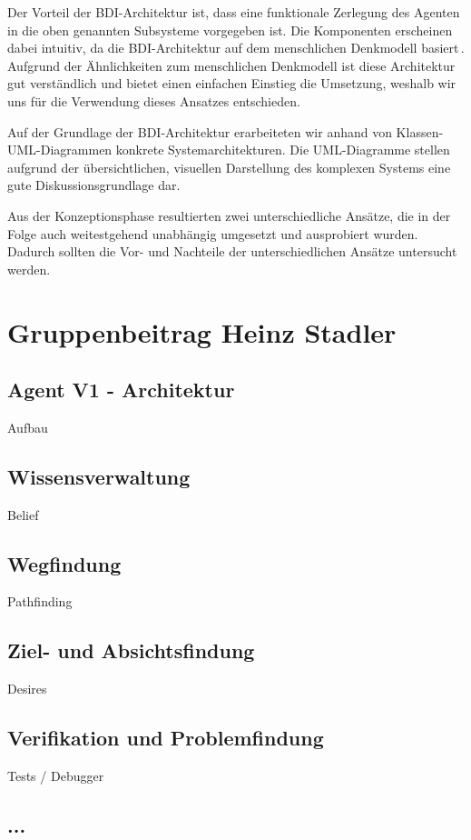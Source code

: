 \documentclass[runningheads]{llncs}
\begin{document}
Der Vorteil der BDI-Architektur ist, dass eine funktionale Zerlegung des Agenten in die oben genannten Subsysteme vorgegeben ist. Die Komponenten erscheinen dabei intuitiv, da die BDI-Architektur auf dem menschlichen Denkmodell basiert\,\cite{Weiss2000}. Aufgrund der Ähnlichkeiten zum menschlichen Denkmodell ist diese Architektur gut verständlich und bietet einen einfachen Einstieg die Umsetzung, weshalb wir uns für die Verwendung dieses Ansatzes entschieden.

Auf der Grundlage der BDI-Architektur erarbeiteten wir anhand von Klassen-UML-Diagrammen konkrete Systemarchitekturen. Die UML-Diagramme stellen aufgrund der übersichtlichen, visuellen Darstellung des komplexen Systems eine gute Diskussionsgrundlage dar.

Aus der Konzeptionsphase resultierten zwei unterschiedliche Ansätze, die in der Folge auch weitestgehend unabhängig umgesetzt und ausprobiert wurden. Dadurch sollten die Vor- und Nachteile der unterschiedlichen Ansätze untersucht werden.

\section{Gruppenbeitrag Heinz Stadler}
 
\subsection{Agent V1 - Architektur}
Aufbau

\subsection{Wissensverwaltung}
Belief

\subsection{Wegfindung}
Pathfinding

\subsection{Ziel- und Absichtsfindung}
Desires

\subsection{Verifikation und Problemfindung}
Tests / Debugger

\subsection{...}
\end{document}
